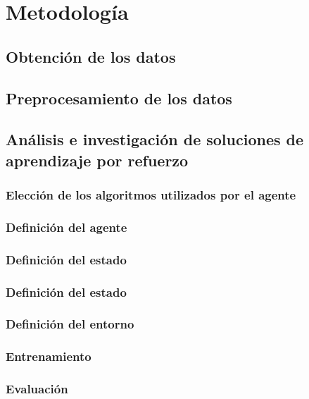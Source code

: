 
\cleardoublepage

\chapter{Metodología}
\label{metodologia}

\section{Obtención de los datos}
\label{obtencion-datos}

\section{Preprocesamiento de los datos}
\label{preprocesamiento-datos}

\section{Análisis e investigación de soluciones de aprendizaje por refuerzo}
\label{investigacion-soluciones-aprendizaje-refuerzo}

\subsection{Elección de los algoritmos utilizados por el agente}
\label{eleccion-de-algoritmos}

\subsection{Definición del agente}
\label{definicion-del-agente}

\subsection{Definición del estado}
\label{definicion-del-estado}

\subsection{Definición del estado}
\label{definicion-de-recompensa}

\subsection{Definición del entorno}
\label{definicion-del-entorno}

\subsection{Entrenamiento}
\label{entrenamiento}

\subsection{Evaluación}
\label{evaluacion}

\section{}
\label{investigacion-soluciones-aprendizaje-refuerzo}